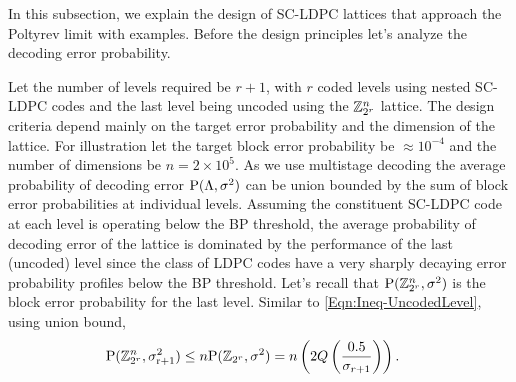 \documentclass[journal,draftcls,onecolumn,12pt,twoside]{IEEEtran}
\begin{document}
In this subsection, we explain the design of SC-LDPC lattices that approach the Poltyrev limit with examples. Before the design principles  let's analyze the decoding error probability.

Let the number of levels required be $r+1$, with $r$ coded levels using nested SC-LDPC codes and the last level being uncoded using the $\mathbb{Z}_{2^r}^{n}$ lattice. The design criteria depend mainly on the target error probability and the dimension of the lattice. For illustration let the  target block error probability be $\approx10^{-4}$ and the number of dimensions be $n=2 \times 10^{5}$.
As we use multistage decoding the average probability of decoding error $\text{P}(\Lambda,\sigma^{2})$ can be union bounded by the sum of block error probabilities at individual levels. Assuming the constituent SC-LDPC code at each level is operating below the BP threshold\cite{richardson2008modern}, the average probability of decoding error of the lattice is dominated by the performance of the last (uncoded) level since the class of LDPC codes have a very sharply decaying error probability profiles below the BP threshold. Let's recall that  $\text{P}(\mathbb{Z}_{2^r}^{n},\sigma^{2})$ is the block error probability for the last level. Similar to \eqref{Eqn:Ineq-UncodedLevel}, using union bound,
\begin{align}
\text{P}(\mathbb{Z}_{2^r}^{n},\sigma_{\text{r+1}}^{2})&\leq n\text{P}(\mathbb{Z}_{2^r},\sigma^{2})=n\left(2Q\left(\frac{0.5}{\sigma_{r+1}}\right)	\right).
\label{Eqn:ZLatticeProb}
\end{align}

\end{document}
